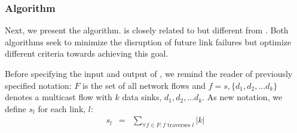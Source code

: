 

\subsubsection{\md Algorithm}
\label{subsubsec:md-alg}

Next, we present the \md algorithm. \md is closely related to but different from \mfs.  Both algorithms seek to minimize the disruption of future link failures but optimize different
criteria towards achieving this goal.  

Before specifying the input and output of \mds, we remind the reader of previously specified notation: $F$ is the set of all network flows and 
$f = s,\{d_1,d_2, ... d_k\}$ denotes a multicast flow with $k$ data sinks, $d_1,d_2, ... d_k$.  As new notation, we define $s_l$ for each link, $l$: %
\begin{eqnarray}
s_l &=& \sum_{\forall f \in F : f \text{ traverses } l} |k|
\end{eqnarray}

